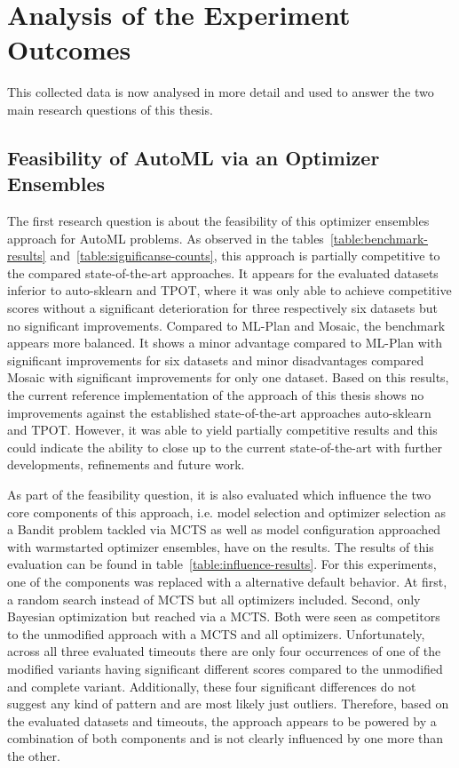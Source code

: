 \section{Analysis of the Experiment Outcomes}
\label{sec:evaluation:analysis}
This collected data is now analysed in more detail and used to answer the two main research questions of this thesis.

\subsection{Feasibility of AutoML via an Optimizer Ensembles}
\label{sec:evaluation:analysis:feasibility}
The first research question is about the feasibility of this optimizer ensembles approach for AutoML problems.\newline
As observed in the  tables~\ref{table:benchmark-results} and~\ref{table:significanse-counts}, this approach is partially competitive to the compared state-of-the-art approaches.
It appears for the evaluated datasets inferior to auto-sklearn and TPOT, where it was only able to achieve competitive scores without a significant deterioration for three respectively six datasets but no significant improvements.
Compared to ML-Plan and Mosaic, the benchmark appears more balanced.
It shows a minor advantage compared to ML-Plan with significant improvements for six datasets and minor disadvantages compared Mosaic with significant improvements for only one dataset.\newline
Based on this results, the current reference implementation of the approach of this thesis shows no improvements against the established state-of-the-art approaches auto-sklearn and TPOT.
However, it was able to yield partially competitive results and this could indicate the ability to close up to the current state-of-the-art with further developments, refinements and future work.

As part of the feasibility question, it is also evaluated which influence the two core components of this approach, i.e. model selection and optimizer selection as a Bandit problem tackled via MCTS as well as model configuration approached with warmstarted optimizer ensembles, have on the results.
The results of this evaluation can be found in table~\ref{table:influence-results}.\newline
For this experiments, one of the components was replaced with a alternative default behavior.
At first, a random search instead of MCTS but all optimizers included.
Second, only Bayesian optimization but reached via a MCTS.
Both were seen as competitors to the unmodified approach with a MCTS and all optimizers.\newline
Unfortunately, across all three evaluated timeouts there are only four occurrences of one of the modified variants having significant different scores compared to the unmodified and complete variant.
Additionally, these four significant differences do not suggest any kind of pattern and are most likely just outliers.
Therefore, based on the evaluated datasets and timeouts, the approach appears to be powered by a combination of both components and is not clearly influenced by one more than the other.

